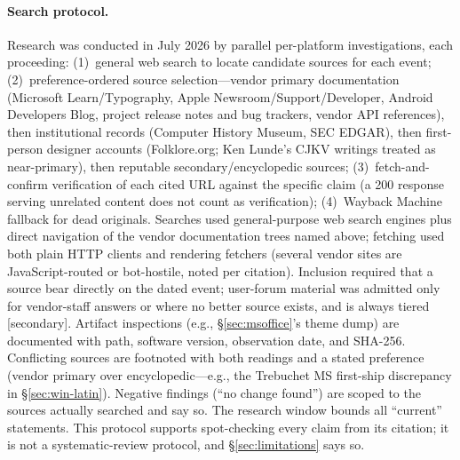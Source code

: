\documentclass[10pt,a4paper]{article}
\begin{document}
\paragraph{Search protocol.} Research was conducted in July 2026 by parallel
per-platform investigations, each proceeding: (1)~general web search to locate
candidate sources for each event; (2)~preference-ordered source selection---vendor
primary documentation (Microsoft Learn/Typography, Apple Newsroom/Support/Developer,
Android Developers Blog, project release notes and bug trackers, vendor API
references), then institutional records (Computer History Museum, SEC EDGAR), then
first-person designer accounts (Folklore.org; Ken Lunde's CJKV writings treated as
near-primary), then reputable secondary/encyclopedic sources; (3)~fetch-and-confirm
verification of each cited URL against the specific claim (a 200 response serving
unrelated content does not count as verification); (4)~Wayback Machine fallback for
dead originals. Searches used general-purpose web search engines plus direct
navigation of the vendor documentation trees named above; fetching used both plain
HTTP clients and rendering fetchers (several vendor sites are JavaScript-routed or
bot-hostile, noted per citation). Inclusion required that a source bear directly on
the dated event; user-forum material was admitted only for vendor-staff answers or
where no better source exists, and is always tiered [secondary]. Artifact
inspections (e.g., \S\ref{sec:msoffice}'s theme dump) are documented with path,
software version, observation date, and SHA-256. Conflicting sources are footnoted
with both readings and a stated preference (vendor primary over encyclopedic---e.g.,
the Trebuchet MS first-ship discrepancy in \S\ref{sec:win-latin}). Negative findings
(``no change found'') are scoped to the sources actually searched and say so. The
research window bounds all ``current'' statements. This protocol supports
spot-checking every claim from its citation; it is not a systematic-review protocol,
and \S\ref{sec:limitations} says so.
\end{document}
